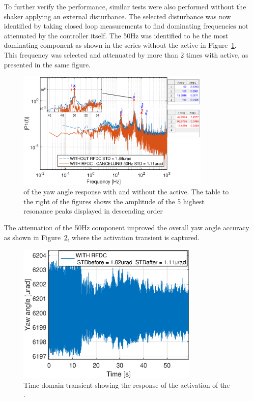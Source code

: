 To further verify the performance, similar tests were also performed without the shaker applying an external disturbance. The selected disturbance was now identified by taking closed loop measurements to find dominating frequencies not attenuated by the controller itself. The 50Hz was identified to be the most dominating component as shown in the series without the \abbrRFDC active in Figure~\ref{fig:fft_closedloop_50}. This frequency was selected and attenuated by more than 2 times with \abbrRFDC active, as presented in the same figure.

\begin{figure}[h]
  \centering %
  \includegraphics[width=0.85\textwidth]{fig/matlab/fft_closedloop_50Hz}
  \caption{\label{fig:fft_closedloop_50}\abbrFFT of the yaw angle response with and without the \abbrRFDC active. The table to the right of the figures shows the amplitude of the 5 highest resonance peaks displayed in descending order}
\end{figure}

The attenuation of the 50Hz component improved the overall yaw angle accuracy as shown in Figure~\ref{fig:transient_closedloop_50}, where the activation transient is captured.

\begin{figure}[h]
  \centering %
  \includegraphics[width=0.8\textwidth]{fig/matlab/transient_closedloop_50Hz}
  \caption{\label{fig:transient_closedloop_50}Time domain transient showing the response of the activation of the \abbrRFDC.}
\end{figure}

